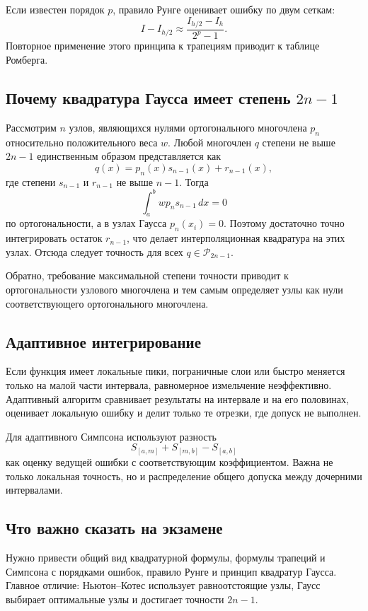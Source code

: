 Если известен порядок $p$, правило Рунге оценивает ошибку по двум сеткам:
\[
    I-I_{h/2}\approx
    \frac{I_{h/2}-I_h}{2^p-1}.
\]
Повторное применение этого принципа к трапециям приводит к таблице Ромберга.

\subsection[Почему квадратура Гаусса имеет степень 2n-1]{Почему квадратура Гаусса имеет степень $2n-1$}

Рассмотрим $n$ узлов, являющихся нулями ортогонального многочлена $p_n$ относительно
положительного веса $w$. Любой многочлен $q$ степени не выше $2n-1$ единственным образом
представляется как
\[
    q(x)=p_n(x)s_{n-1}(x)+r_{n-1}(x),
\]
где степени $s_{n-1}$ и $r_{n-1}$ не выше $n-1$. Тогда
\[
    \int_a^b w p_n s_{n-1}\,dx=0
\]
по ортогональности, а в узлах Гаусса $p_n(x_i)=0$. Поэтому достаточно точно
интегрировать остаток $r_{n-1}$, что делает интерполяционная квадратура на этих узлах.
Отсюда следует точность для всех $q\in\mathcal P_{2n-1}$.

Обратно, требование максимальной степени точности приводит к ортогональности узлового
многочлена и тем самым определяет узлы как нули соответствующего ортогонального
многочлена.

\subsection{Адаптивное интегрирование}

Если функция имеет локальные пики, пограничные слои или быстро меняется только на малой
части интервала, равномерное измельчение неэффективно. Адаптивный алгоритм сравнивает
результаты на интервале и на его половинах, оценивает локальную ошибку и делит только те
отрезки, где допуск не выполнен.

Для адаптивного Симпсона используют разность
\[
    S_{[a,m]}+S_{[m,b]}-S_{[a,b]}
\]
как оценку ведущей ошибки с соответствующим коэффициентом. Важна не только локальная
точность, но и распределение общего допуска между дочерними интервалами.

\subsection{Что важно сказать на экзамене}

Нужно привести общий вид квадратурной формулы, формулы трапеций и Симпсона с
порядками ошибок, правило Рунге и принцип квадратур Гаусса. Главное отличие:
Ньютон--Котес использует равноотстоящие узлы, Гаусс выбирает оптимальные узлы и
достигает точности $2n-1$.

\newpage